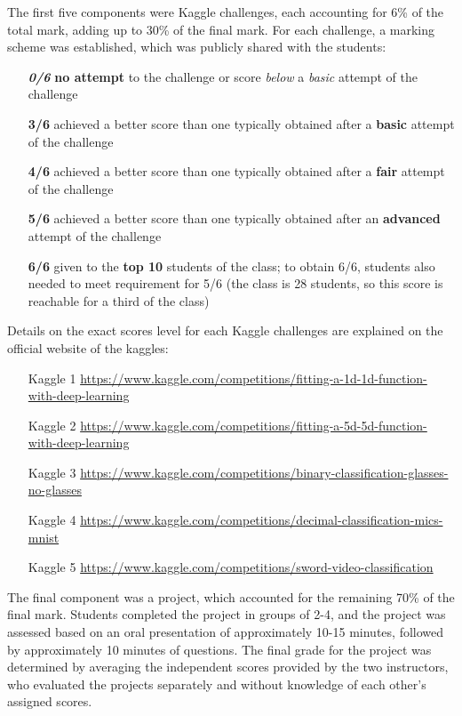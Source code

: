 \documentclass[a4paper]{article}
\begin{document}
	The first five components were Kaggle challenges, each accounting for 6\% of the total mark, adding up to 30\% of the final mark.
	For each challenge, a marking scheme was established, which was publicly shared with the students:
	\begin{itemize}
		\item [\textbf{\textit{0/6}}] \textbf{no attempt} to the challenge or score \textit{below} a \textit{basic} attempt of the challenge
		\item [\textbf{3/6}] achieved a better score than one typically obtained after a \textbf{basic} attempt of the challenge
		\item [\textbf{4/6}] achieved a better score than one typically obtained after a \textbf{fair} attempt of the challenge
		\item [\textbf{5/6}] achieved a better score than one typically obtained after an \textbf{advanced} attempt of the challenge
		\item [\textbf{6/6}] given to the \textbf{top 10} students of the class; to obtain 6/6, students also needed to meet requirement for 5/6 (the class is 28 students, so this score is reachable for a third of the class)

	\end{itemize}
	Details on the exact scores level for each Kaggle challenges are explained on the official website of the kaggles:
	\begin{itemize}
		\item [Kaggle 1] \url{https://www.kaggle.com/competitions/fitting-a-1d-1d-function-with-deep-learning}
		\item [Kaggle 2] \url{https://www.kaggle.com/competitions/fitting-a-5d-5d-function-with-deep-learning}
		\item [Kaggle 3] \url{https://www.kaggle.com/competitions/binary-classification-glasses-no-glasses}
		\item [Kaggle 4] \url{https://www.kaggle.com/competitions/decimal-classification-mics-mnist}
		\item [Kaggle 5] \url{https://www.kaggle.com/competitions/sword-video-classification}
	\end{itemize}
	
	The final component was a project, which accounted for the remaining 70\% of the final mark.
	Students completed the project in groups of 2-4, and the project was assessed based on an oral presentation of approximately 10-15 minutes, followed by approximately 10 minutes of questions.
	The final grade for the project was determined by averaging the independent scores provided by the two instructors, who evaluated the projects separately and without knowledge of each other's assigned scores.
	
\end{document}
